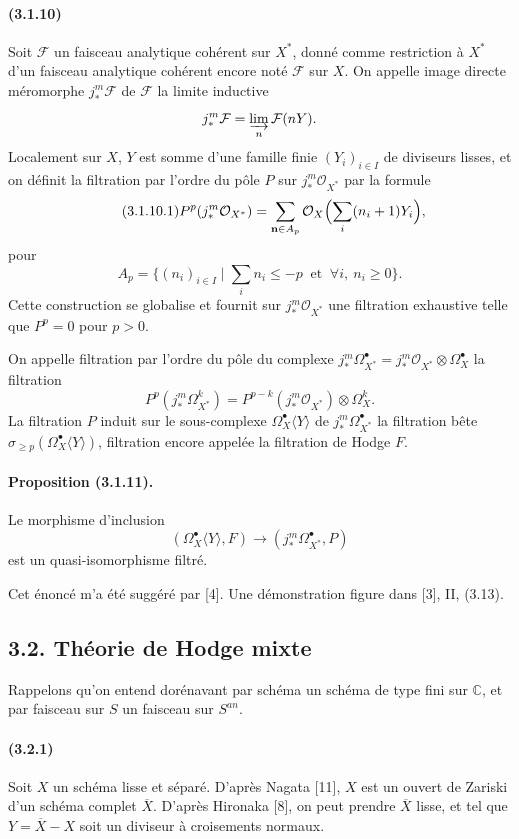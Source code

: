 \documentclass[10pt]{article}
\newcommand{\C}{\mathbb C}
\providecommand{\cO}{\mathcal O}
\providecommand{\cO}{\mathcal O}
\begin{document}
\paragraph{(3.1.10)} Soit $\mathcal F$ un faisceau analytique cohérent sur $X^*$, donné comme restriction à $X^*$ d'un faisceau analytique cohérent encore noté $\mathcal F$ sur $X$. On appelle image directe méromorphe $j_*^m\mathcal F$ de $\mathcal F$ la limite inductive
\[
j_*^m\mathcal F=\varinjlim_n \mathcal F(nY).
\]
Localement sur $X$, $Y$ est somme d'une famille finie $(Y_i)_{i\in I}$ de diviseurs lisses, et on définit la filtration par l'ordre du pôle $P$ sur $j_*^m\cO_{X^*}$ par la formule
\[
\tag{3.1.10.1}
P^p(j_*^m\cO_{X^*})=
\sum_{\mathbf n\in A_p}\cO_X\Bigl(\sum_i(n_i+1)Y_i\Bigr),
\]
pour
\[
A_p=\{(n_i)_{i\in I}\mid \sum_i n_i\le -p\ \text{ et }\ \forall i,\ n_i\ge0\}.
\]
Cette construction se globalise et fournit sur $j_*^m\cO_{X^*}$ une filtration exhaustive telle que $P^p=0$ pour $p>0$.

On appelle filtration par l'ordre du pôle du complexe $j_*^m\Omega_{X^*}^\bullet=j_*^m\cO_{X^*}\otimes\Omega_X^\bullet$ la filtration
\[
\tag{3.1.10.2}
P^p(j_*^m\Omega_{X^*}^k)=P^{p-k}(j_*^m\cO_{X^*})\otimes\Omega_X^k.
\]
La filtration $P$ induit sur le sous-complexe $\Omega_X^\bullet\langle Y\rangle$ de $j_*^m\Omega_{X^*}^\bullet$ la filtration bête $\sigma_{\ge p}(\Omega_X^\bullet\langle Y\rangle)$, filtration encore appelée la filtration de Hodge $F$.

\paragraph{Proposition (3.1.11).} Le morphisme d'inclusion
\[
(\Omega_X^\bullet\langle Y\rangle,F)\longrightarrow(j_*^m\Omega_{X^*}^\bullet,P)
\]
est un quasi-isomorphisme filtré.

Cet énoncé m'a été suggéré par [4]. Une démonstration figure dans [3], II, (3.13).

\subsection*{3.2. Théorie de Hodge mixte}

Rappelons qu'on entend dorénavant par schéma un schéma de type fini sur $\C$, et par faisceau sur $S$ un faisceau sur $S^{an}$.

\paragraph{(3.2.1)} Soit $X$ un schéma lisse et séparé. D'après Nagata [11], $X$ est un ouvert de Zariski d'un schéma complet $\overline X$. D'après Hironaka [8], on peut prendre $\overline X$ lisse, et tel que $Y=\overline X-X$ soit un diviseur à croisements normaux.
\end{document}
